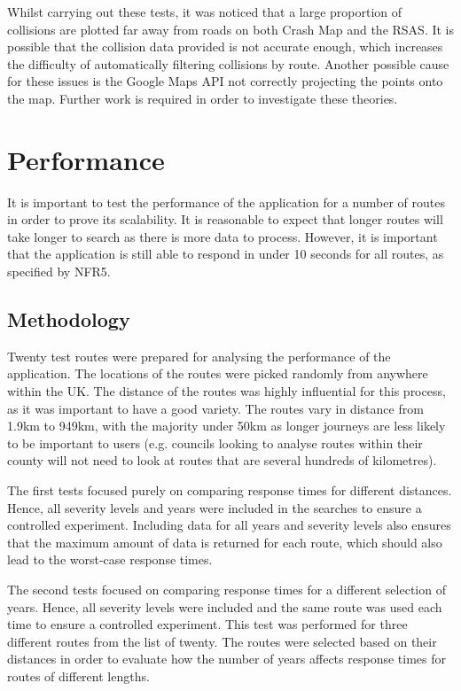\documentclass[authoryearcitations]{UoYCSproject}
\begin{document}
Whilst carrying out these tests, it was noticed that a large proportion of collisions are plotted far away from roads on both Crash Map and the RSAS. It is possible that the collision data provided is not accurate enough, which increases the difficulty of automatically filtering collisions by route. Another possible cause for these issues is the Google Maps API not correctly projecting the points onto the map. Further work is required in order to investigate these theories.

\section{Performance}

It is important to test the performance of the application for a number of routes in order to prove its scalability. It is reasonable to expect that longer routes will take longer to search as there is more data to process. However, it is important that the application is still able to respond in under 10 seconds for all routes, as specified by NFR5. 

\subsection{Methodology}

Twenty test routes were prepared for analysing the performance of the application. The locations of the routes were picked randomly from anywhere within the UK. The distance of the routes was highly influential for this process, as it was important to have a good variety. The routes vary in distance from 1.9km to 949km, with the majority under 50km as longer journeys are less likely to be important to users (e.g. councils looking to analyse routes within their county will not need to look at routes that are several hundreds of kilometres).

The first tests focused purely on comparing response times for different distances. Hence, all severity levels and years were included in the searches to ensure a controlled experiment. Including data for all years and severity levels also ensures that the maximum amount of data is returned for each route, which should also lead to the worst-case response times. 

The second tests focused on comparing response times for a different selection of years. Hence, all severity levels were included and the same route was used each time to ensure a controlled experiment. This test was performed for three different routes from the list of twenty. The routes were selected based on their distances in order to evaluate how the number of years affects response times for routes of different lengths.
\end{document}
